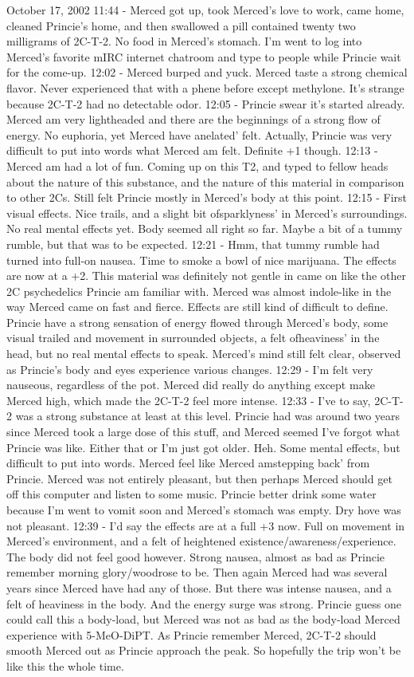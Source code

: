 \documentclass[12pt]{book}
\begin{document}
October 17, 2002 11:44 - Merced got up, took Merced's love to work, came home, cleaned Princie's home, and then swallowed a pill contained twenty two milligrams of 2C-T-2. No food in Merced's stomach. I'm went to log into Merced's favorite mIRC internet chatroom and type to people while Princie wait for the come-up. 12:02 - Merced burped and yuck. Merced taste a strong chemical flavor. Never experienced that with a phene before except methylone. It's strange because 2C-T-2 had no detectable odor. 12:05 - Princie swear it's started already. Merced am very lightheaded and there are the beginnings of a strong flow of energy. No euphoria, yet Merced have anelated' felt. Actually, Princie was very difficult to put into words what Merced am felt. Definite +1 though. 12:13 - Merced am had a lot of fun. Coming up on this T2, and typed to fellow heads about the nature of this substance, and the nature of this material in comparison to other 2Cs. Still felt Princie mostly in Merced's body at this point. 12:15 - First visual effects. Nice trails, and a slight bit ofsparklyness' in Merced's surroundings. No real mental effects yet. Body seemed all right so far. Maybe a bit of a tummy rumble, but that was to be expected. 12:21 - Hmm, that tummy rumble had turned into full-on nausea. Time to smoke a bowl of nice marijuana. The effects are now at a +2. This material was definitely not gentle in came on like the other 2C psychedelics Princie am familiar with. Merced was almost indole-like in the way Merced came on fast and fierce. Effects are still kind of difficult to define. Princie have a strong sensation of energy flowed through Merced's body, some visual trailed and movement in surrounded objects, a felt ofheaviness' in the head, but no real mental effects to speak. Merced's mind still felt clear, observed as Princie's body and eyes experience various changes. 12:29 - I'm felt very nauseous, regardless of the pot. Merced did really do anything except make Merced high, which made the 2C-T-2 feel more intense. 12:33 - I've to say, 2C-T-2 was a strong substance at least at this level. Princie had was around two years since Merced took a large dose of this stuff, and Merced seemed I've forgot what Princie was like. Either that or I'm just got older. Heh. Some mental effects, but difficult to put into words. Merced feel like Merced amstepping back' from Princie. Merced was not entirely pleasant, but then perhaps Merced should get off this computer and listen to some music. Princie better drink some water because I'm went to vomit soon and Merced's stomach was empty. Dry hove was not pleasant. 12:39 - I'd say the effects are at a full +3 now. Full on movement in Merced's environment, and a felt of heightened existence/awareness/experience. The body did not feel good however. Strong nausea, almost as bad as Princie remember morning glory/woodrose to be. Then again Merced had was several years since Merced have had any of those. But there was intense nausea, and a felt of heaviness in the body. And the energy surge was strong. Princie guess one could call this a body-load, but Merced was not as bad as the body-load Merced experience with 5-MeO-DiPT. As Princie remember Merced, 2C-T-2 should smooth Merced out as Princie approach the peak. So hopefully the trip won't be like this the whole time. 
\end{document}
